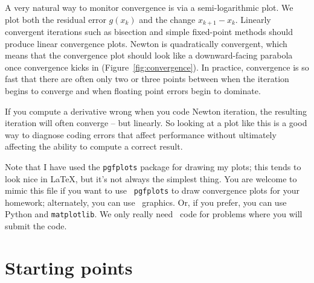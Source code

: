 \documentclass[12pt, leqno]{article}
\begin{document}
A very natural way to monitor convergence is via a semi-logarithmic
plot.  We plot both the residual error $g(x_k)$ and the change
$x_{k+1}-x_k$.  Linearly convergent iterations such as bisection and
simple fixed-point methods should produce linear convergence plots.
Newton is quadratically convergent, which means that the convergence
plot should look like a downward-facing parabola once convergence
kicks in (Figure~\ref{fig:convergence}).  In practice, convergence is
so fast that there are often only two or three points between when the
iteration begins to converge and when floating point errors begin to
dominate.

If you compute a derivative wrong when you code Newton iteration, the
resulting iteration will often converge -- but linearly.  So looking
at a plot like this is a good way to diagnose coding errors that
affect performance without ultimately affecting the ability to compute
a correct result.

Note that I have used the {\tt pgfplots} package for drawing my plots;
this tends to look nice in \LaTeX, but it's not always the simplest
thing.  You are welcome to mimic this file if you want to use {\tt
  pgfplots} to draw convergence plots for your homework; alternately,
you can use \matlab\ graphics.  Or, if you prefer, you can use
Python and {\tt matplotlib}.  We only really need \matlab\ code for
problems where you will submit the code.

\section*{Starting points}
\end{document}
